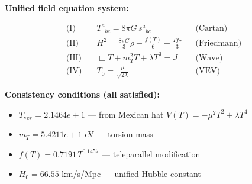 
\textbf{Unified field equation system:}

\begin{align}
  \text{(I)} \quad & T^a{}_{bc} = 8\pi G \, s^a{}_{bc} && \text{(Cartan)} \\
  \text{(II)} \quad & H^2 = \frac{8\pi G}{3}\rho - \frac{f(T)}{6} + \frac{Tf_T}{3} && \text{(Friedmann)} \\
  \text{(III)} \quad & \Box T + m_T^2 T + \lambda T^3 = J && \text{(Wave)} \\
  \text{(IV)} \quad & T_0 = \frac{\mu}{\sqrt{2\lambda}} && \text{(VEV)}
\end{align}

\textbf{Consistency conditions (all satisfied):}
\begin{itemize}
  \item $T_{\text{vev}} = 2.1464e+1$ — from Mexican hat $V(T) = -\mu^2 T^2 + \lambda T^4$
  \item $m_T = 5.4211e+1$ eV — torsion mass
  \item $f(T) = 0.7191 \, T^{0.1457}$ — teleparallel modification
  \item $H_0 = 66.55$ km/s/Mpc — unified Hubble constant
\end{itemize}